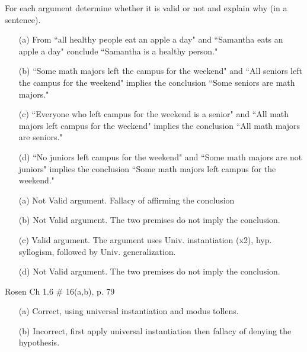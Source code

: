 \begin{questions}
 For each argument determine whether it is valid or not and explain why (in a sentence).
    \begin{itemize}[itemsep=0pt,parsep=0pt,topsep=0pt,partopsep=0pt]
    \item[(a)] From  ``all healthy people eat an apple a day" and  ``Samantha eats an apple a day" conclude ``Samantha is a healthy person."  
    \item[(b)] ``Some math majors left the campus for the weekend" and ``All seniors left the campus for the weekend" implies the conclusion ``Some seniors are math majors."
    \item[(c)] ``Everyone who left campus for the weekend is a senior" and ``All math majors left campus for the weekend"  implies the conclusion ``All math majors are seniors." 
    \item[(d)] ``No juniors left campus for the weekend" and ``Some math majors are not juniors" implies the conclusion ``Some math majors left campus for the weekend."
    \end{itemize}
   \ifprintanswers
        \vspace{-10pt}
    \fi
\begin{solution}
    \begin{itemize}
        \item[(a)] Not Valid argument.  Fallacy of affirming the conclusion
    \item[(b)] Not Valid argument.  The two premises do not imply the conclusion.
        \item[(c)] Valid argument. The argument uses Univ. instantiation (x2), hyp. syllogism, followed by Univ. generalization.
        \item[(d)] Not Valid argument.  The two premises do not imply the conclusion.
    \end{itemize}
\end{solution}



 Rosen Ch 1.6 \# 16(a,b), p. 79
    \ifprintanswers
        \vspace{-15pt}
    \fi
\begin{solution}
    \begin{itemize}[itemsep=0pt,parsep=0pt,topsep=0pt,partopsep=0pt]
        \item[(a)] Correct, using universal instantiation and modus tollens.
        \item[(b)] Incorrect, first apply universal instantiation then fallacy of denying the hypothesis.
    \end{itemize}
\end{solution}




\end{questions}
